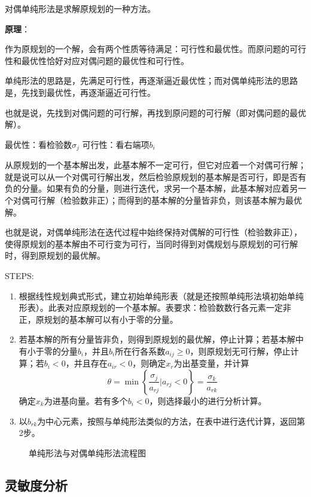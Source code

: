 \documentclass{book}
\begin{document}
对偶单纯形法是求解原规划的一种方法。

\textbf{原理}：

作为原规划的一个解，会有两个性质等待满足：可行性和最优性。而原问题的可行性和最优性恰好对应对偶问题的最优性和可行性。

单纯形法的思路是，先满足可行性，再逐渐逼近最优性；而对偶单纯形法的思路是，先找到最优性，再逐渐逼近可行性。

也就是说，先找到对偶问题的可行解，再找到原问题的可行解（即对偶问题的最优解）。

最优性：看检验数$\sigma_j$
可行性：看右端项$b_i$

从原规划的一个基本解出发，此基本解不一定可行，但它对应着一个对偶可行解；就是说可以从一个对偶可行解出发，然后检验原规划的基本解是否可行，即是否有负的分量。如果有负的分量，则进行迭代，求另一个基本解，此基本解对应着另一个对偶可行解（检验数非正）；而得到的基本解的分量皆非负，则该基本解为最优解。

也就是说，对偶单纯形法在迭代过程中始终保持对偶解的可行性（检验数非正），使得原规划的基本解由不可行变为可行，当同时得到对偶规划与原规划的可行解时，得到原规划的最优解。

STEPS:
\begin{enumerate}
    \item 根据线性规划典式形式，建立初始单纯形表（就是还按照单纯形法填初始单纯形表）。此表对应原规划的一个基本解。表要求：检验数数行各元素一定非正，原规划的基本解可以有小于零的分量。
    \item 若基本解的所有分量皆非负，则得到原规划的最优解，停止计算；若基本解中有小于零的分量$b_i$，并且$b_i$所在行各系数$a_{ij}\ge0$，则原规划无可行解，停止计算；若$b_i<0$，并且存在$a_{ir}<0$，则确定$x_r$为出基变量，并计算$$\theta=\min\left\{\frac{\sigma_j}{a_{rj}}|a_{rj}<0\right\}=\frac{\sigma_k}{a_{rk}}$$确定$x_k$为进基向量。若有多个$b_i<0$，则选择最小的进行分析计算。
    \item 以$b_{rk}$为中心元素，按照与单纯形法类似的方法，在表中进行迭代计算，返回第2步。
\end{enumerate}

\begin{figure}[ht]
    \centering
    
    \caption{单纯形法与对偶单纯形法流程图}
    \label{con:DualSMFlow}
\end{figure}


\subsection{灵敏度分析}
\end{document}
